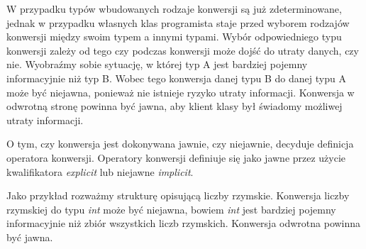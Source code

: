 W przypadku typów wbudowanych rodzaje konwersji są już zdeterminowane, jednak w przypadku własnych klas 
programista staje przed wyborem rodzajów konwersji między swoim typem a innymi typami.
Wybór odpowiedniego typu konwersji zależy od tego czy podczas konwersji może dojść do utraty danych, czy nie.
Wyobraźmy sobie sytuację, w której typ A jest bardziej pojemny informacyjnie niż typ B. Wobec tego 
konwersja danej typu B do danej typu A może być niejawna, ponieważ nie istnieje ryzyko utraty informacji.
Konwersja w odwrotną stronę powinna być jawna, aby klient klasy był świadomy możliwej utraty informacji.

O tym, czy konwersja jest dokonywana jawnie, czy niejawnie, decyduje
definicja operatora konwersji. Operatory konwersji definiuje się jako jawne przez użycie kwalifikatora
{\em explicit} lub niejawne {\em implicit}. 

Jako przykład rozważmy strukturę opisującą liczby rzymskie. Konwersja liczby rzymskiej do
typu {\em int} może być niejawna, bowiem {\em int} jest bardziej pojemny informacyjnie niż zbiór
wszystkich liczb rzymskich. Konwersja odwrotna powinna być jawna.

